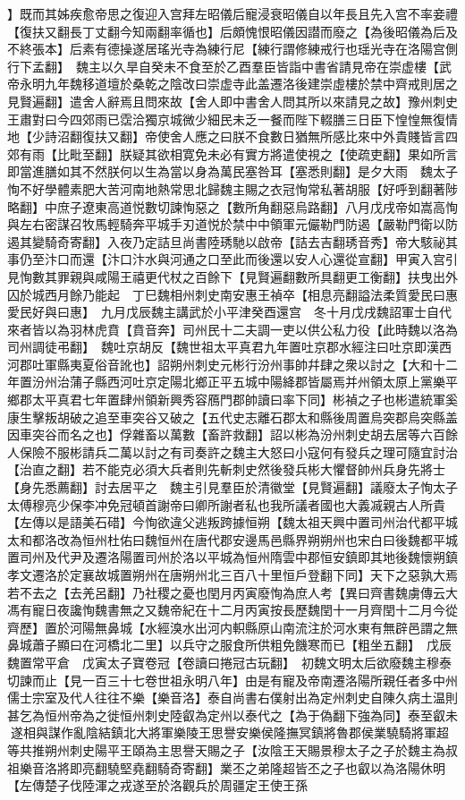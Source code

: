 】既而其姊疾愈帝思之復迎入宫拜左昭儀后寵浸衰昭儀自以年長且先入宫不率妾禮【復扶又翻長丁丈翻今知兩翻率循也】后頗愧恨昭儀因譛而廢之【為後昭儀為后及不終張本】后素有德操遂居瑤光寺為練行尼【練行謂修練戒行也瑶光寺在洛陽宫側行下孟翻】　魏主以久旱自癸未不食至於乙酉羣臣皆詣中書省請見帝在崇虚樓【武帝永明九年魏移道壇於桑乾之陰改曰崇虚寺此盖遷洛後建崇虛樓於禁中齊戒則居之見賢遍翻】遣舍人辭焉且問來故【舍人即中書舍人問其所以來請見之故】豫州刺史王肅對曰今四郊雨已霑洽獨京城微少細民未乏一餐而陛下輟膳三日臣下惶惶無復情地【少詩沼翻復扶又翻】帝使舍人應之曰朕不食數日猶無所感比來中外貴賤皆言四郊有雨【比毗至翻】朕疑其欲相寛免未必有實方將遣使視之【使疏吏翻】果如所言即當進膳如其不然朕何以生為當以身為萬民塞咎耳【塞悉則翻】是夕大雨　魏太子恂不好學體素肥大苦河南地熱常思北歸魏主賜之衣冠恂常私著胡服【好呼到翻著陟略翻】中庶子遼東高道悦數切諫恂惡之【數所角翻惡烏路翻】八月戊戌帝如嵩高恂與左右密謀召牧馬輕騎奔平城手刃道悦於禁中中領軍元儼勒門防遏【嚴勒門衛以防遏其變騎奇寄翻】入夜乃定詰旦尚書陸琇馳以啟帝【詰去吉翻琇音秀】帝大駭祕其事仍至汴口而還【汴口汴水與河通之口至此而後還以安人心還從宣翻】甲寅入宫引見恂數其罪親與咸陽王禧更代杖之百餘下【見賢遍翻數所具翻更工衡翻】扶曳出外囚於城西月餘乃能起　丁巳魏相州刺史南安惠王禎卒【相息亮翻謚法柔質愛民曰惠愛民好與曰惠】　九月戊辰魏主講武於小平津癸酉還宫　冬十月戊戌魏詔軍士自代來者皆以為羽林虎賁【賁音奔】司州民十二夫調一吏以供公私力役【此時魏以洛為司州調徒弔翻】　魏吐京胡反【魏世祖太平真君九年置吐京郡水經注曰吐京即漢西河郡吐軍縣夷夏俗音訛也】詔朔州刺史元彬行汾州事帥幷肆之衆以討之【大和十二年置汾州治蒲子縣西河吐京定陽北鄉正平五城中陽絳郡皆屬焉并州領太原上黨樂平鄉郡太平真君七年置肆州領新興秀容鴈門郡帥讀曰率下同】彬禎之子也彬遣統軍奚康生擊叛胡破之追至車突谷又破之【五代史志離石郡太和縣後周置烏突郡烏突縣盖因車突谷而名之也】俘雜畜以萬數【畜許救翻】詔以彬為汾州刺史胡去居等六百餘人保險不服彬請兵二萬以討之有司奏許之魏主大怒曰小寇何有發兵之理可隨宜討治【治直之翻】若不能克必須大兵者則先斬刺史然後發兵彬大懼督帥州兵身先將士【身先悉薦翻】討去居平之　魏主引見羣臣於清徽堂【見賢遍翻】議廢太子恂太子太傅穆亮少保李冲免冠頓首謝帝曰卿所謝者私也我所議者國也大義㓕親古人所貴【左傳以是語美石碏】今恂欲違父逃叛跨據恒朔【魏太祖天興中置司州治代都平城太和都洛改為恒州杜佑曰魏恒州在唐代郡安邊馬邑縣界朔朔州也宋白曰後魏都平城置司州及代尹及遷洛陽置司州於洛以平城為恒州隋雲中郡恒安鎮即其地後魏懷朔鎮孝文遷洛於定襄故城置朔州在唐朔州北三百八十里恒戶登翻下同】天下之惡孰大焉若不去之【去羌呂翻】乃社稷之憂也閏月丙寅廢恂為庶人考【異曰齊書魏虜傳云大馮有寵日夜讒恂魏書無之又魏帝紀在十二月丙寅按長歷魏閏十一月齊閏十二月今從齊歷】置於河陽無鼻城【水經溴水出河内軹縣原山南流注於河水東有無辟邑謂之無鼻城蕭子顯曰在河橋北二里】以兵守之服食所供粗免饑寒而已【粗坐五翻】　戊辰魏置常平倉　戊寅太子寶卷冠【卷讀曰捲冠古玩翻】　初魏文明太后欲廢魏主穆泰切諫而止【見一百三十七卷世祖永明八年】由是有寵及帝南遷洛陽所親任者多中州儒士宗室及代人往往不樂【樂音洛】泰自尚書右僕射出為定州刺史自陳久病土温則甚乞為恒州帝為之徙恒州刺史陸叡為定州以泰代之【為于偽翻下強為同】泰至叡未遂相與謀作亂陰結鎮北大將軍樂陵王思譽安樂侯隆撫冥鎮將魯郡侯業驍騎將軍超等共推朔州刺史陽平王頤為主思譽天賜之子【汝陰王天賜景穆太子之子於魏主為叔祖樂音洛將即亮翻驍堅堯翻騎奇寄翻】業丕之弟隆超皆丕之子也叡以為洛陽休明【左傳楚子伐陸渾之戎遂至於洛觀兵於周疆定王使王孫